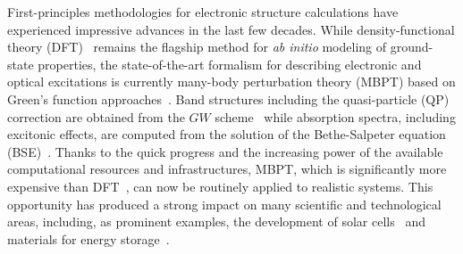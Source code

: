 \documentclass[aps,pra,superscriptaddress,twocolumn]{revtex4}
\begin{document}
First-principles methodologies for electronic structure calculations have experienced impressive advances in the last few decades.
While density-functional theory (DFT)~\cite{hohe-kohn64pr,kohn-sham65pr} remains the flagship method for \textit{ab initio} modeling of ground-state properties, the state-of-the-art formalism for describing electronic and optical excitations is currently many-body perturbation theory (MBPT) based on Green's function approaches~\cite{onid+02rmp}.
Band structures including the quasi-particle (QP) correction are obtained from the $GW$ scheme~\cite{hedi65pr,hybe-loui85prl,hybe-loui86prb} while absorption spectra, including excitonic effects, are computed from the solution of the Bethe-Salpeter equation (BSE)~\cite{stri88rnc,hank-sham80prb,rohl-loui00prb}.
Thanks to the quick progress and the increasing power of the available computational resources and infrastructures, MBPT, which is significantly more expensive than DFT~\cite{onid+02rmp}, can now be routinely applied to realistic systems. 
This opportunity has produced a strong impact on many scientific and technological areas, including, as prominent examples, the development of solar cells~\cite{dean14acr,bren+16natrm,oba-kuma18apex} and materials for energy storage~\cite{jain+16natrm,yoon+17afm}.
\end{document}
